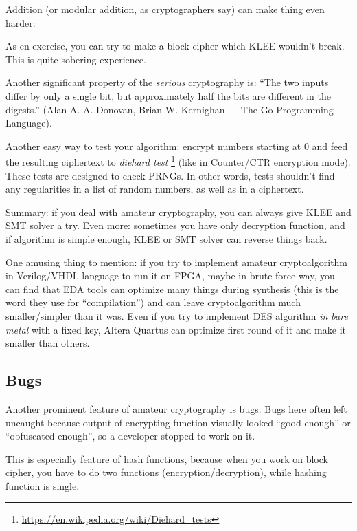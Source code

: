 Addition (or \href{https://yurichev.com/blog/modulo/}{modular addition}, as cryptographers say) can make thing even harder:



As en exercise, you can try to make a block cipher which KLEE wouldn't break.
This is quite sobering experience.

Another significant property of the \textit{serious} cryptography is:
``The two inputs differ by only a single bit, but approximately half the bits are different in the digests.''
(Alan A. A. Donovan, Brian W. Kernighan ---  The Go Programming Language).

Another easy way to test your algorithm: encrypt numbers starting at 0 and feed the resulting ciphertext to \emph{diehard test}
\footnote{\url{https://en.wikipedia.org/wiki/Diehard_tests}} (like in Counter/CTR encryption mode).
These tests are designed to check \ac{PRNG}s.
In other words, tests shouldn't find any regularities in a list of random numbers, as well as in a ciphertext.

Summary: if you deal with amateur cryptography, you can always give KLEE and SMT solver a try.
Even more: sometimes you have only decryption function, and if algorithm is simple enough,
KLEE or SMT solver can reverse things back.

One amusing thing to mention: if you try to implement amateur cryptoalgorithm in Verilog/VHDL language to run it on \ac{FPGA},
maybe in brute-force way,
you can find that \ac{EDA} tools can optimize many things during synthesis
(this is the word they use for ``compilation'') and can leave cryptoalgorithm much smaller/simpler than it was.
Even if you try to implement \ac{DES} algorithm \emph{in bare metal} with a fixed key,
Altera Quartus can optimize first round of it and make it smaller than others.

\subsection{Bugs}

Another prominent feature of amateur cryptography is bugs.
Bugs here often left uncaught because output of encrypting function visually looked ``good enough'' or ``obfuscated enough'',
so a developer stopped to work on it.

This is especially feature of hash functions, because when you work on block cipher, you have to do two functions
(encryption/decryption), while hashing function is single.

